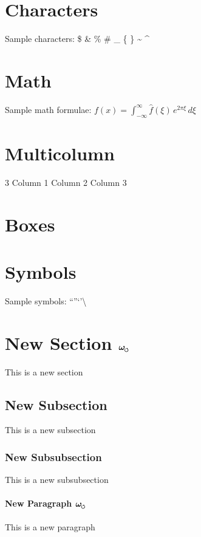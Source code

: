 \documentclass{article}
\newcommand{\omegas}{\boldsymbol{\omega}_{\mkern-2mu\scriptscriptstyle\boldsymbol{\circlearrowleft}}}  %
\begin{document}
    \section{Characters}
    Sample characters:
    \$ \& \% \# \_ \{ \} \~{} \^{}


    \section{Math}
    Sample math formulae:
    $f(x) = \int_{-\infty}^\infty \hat f(\xi)\,e^{2 \pi \xi} \, d\xi$

    \section{Multicolumn}
    \begin{multicols}{3}
        Column 1
        Column 2
        Column 3
    \end{multicols}

    \section{Boxes}
    \medbreak\noindent{}\smallbreak

    \section{Symbols}
    Sample symbols:
    \noindent \textfractionsolidus \textdiv \texttimes \textminus \textpm \textsurd \textlnot \textasteriskcentered
    \textbullet \textperiodcentered \textdagger \textdaggerdbl \textsection \textparagraph \textbardbl \textellipsis
    \textquotedblleft \textquotedblright \textquoteleft \textquoteright \textbackslash \textbullet \textemdash \textendash


\section{New Section $\omegas\quad$} This is a new section
\subsection{New Subsection} This is a new subsection
\subsubsection{New Subsubsection} This is a new subsubsection
\paragraph{New Paragraph  $\omegas\quad$ } This is a new paragraph
\end{document}
